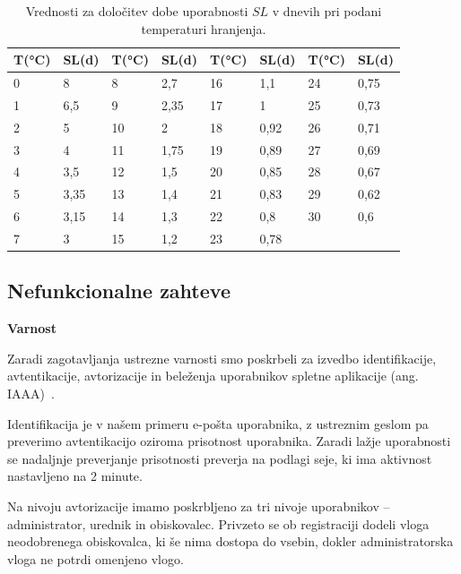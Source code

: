\documentclass[a4paper, 12pt]{book}
\begin{document}
\begin{description}
\begin{table}[h]
\begin{center}
\begin{tabular}{ll|ll|ll|ll}
T(°C) & SL(d) & T(°C) & SL(d) & T(°C) & SL(d) & T(°C) & SL(d) \\ \hline
0     & 8     & 8     & 2,7   & 16    & 1,1   & 24    & 0,75  \\
1     & 6,5   & 9     & 2,35  & 17    & 1     & 25    & 0,73  \\
2     & 5     & 10    & 2     & 18    & 0,92  & 26    & 0,71  \\
3     & 4     & 11    & 1,75  & 19    & 0,89  & 27    & 0,69  \\
4     & 3,5   & 12    & 1,5   & 20    & 0,85  & 28    & 0,67  \\
5     & 3,35  & 13    & 1,4   & 21    & 0,83  & 29    & 0,62  \\
6     & 3,15  & 14    & 1,3   & 22    & 0,8   & 30    & 0,6   \\
7     & 3     & 15    & 1,2   & 23    & 0,78  &       &      
\end{tabular}
\caption{Vrednosti za določitev dobe uporabnosti $SL$ v dnevih pri podani temperaturi hranjenja.}
\label{tab:tabela-sal}
\end{center}
\end{table}
	
\end{description}

\clearpage

\subsection{Nefunkcionalne zahteve}

\noindent \textbf{Varnost}

Zaradi zagotavljanja ustrezne varnosti smo poskrbeli za izvedbo identifikacije, avtentikacije, avtorizacije in beleženja uporabnikov spletne aplikacije (ang. IAAA)~\cite{IAAA-security}.

Identifikacija je v našem primeru e-pošta uporabnika, z ustreznim geslom pa preverimo avtentikacijo oziroma prisotnost uporabnika. Zaradi lažje uporabnosti se nadaljnje preverjanje prisotnosti preverja na podlagi seje, ki ima aktivnost nastavljeno na 2 minute. 

Na nivoju avtorizacije imamo poskrbljeno za tri nivoje uporabnikov – administrator, urednik in obiskovalec. Privzeto se ob registraciji dodeli vloga neodobrenega obiskovalca, ki še nima dostopa do vsebin, dokler administratorska vloga ne potrdi omenjeno vlogo.
\end{document}
